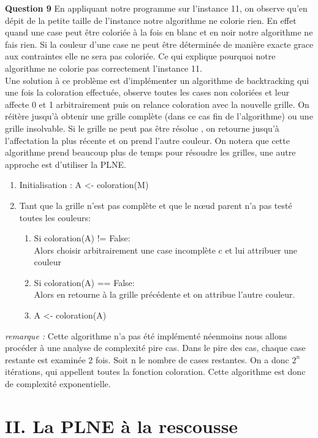 \documentclass[a4paper]{memoir}
\begin{document}
\textbf{Question 9} En appliquant notre programme sur l'instance 11, on observe qu'en dépit de la petite taille de l'instance notre algorithme ne colorie rien. En effet quand une case peut être coloriée à la fois en blanc et en noir notre algorithme ne fais rien. Si la couleur d'une case ne peut être déterminée de manière exacte grace aux contraintes elle ne sera pas coloriée. Ce qui explique pourquoi notre algorithme ne colorie pas correctement l'instance 11.
\\
Une solution à ce problème est d'implémenter un algorithme de backtracking qui une fois la coloration effectuée, observe toutes les cases non coloriées et leur affecte 0 et 1 arbitrairement puis on relance coloration avec la nouvelle grille. On réitère jusqu'à obtenir une grille complète (dans ce cas fin de l'algorithme) ou une grille insolvable. Si le grille ne peut pas être résolue , on retourne jusqu'à l'affectation la plus récente et on prend l'autre couleur. On notera que cette algorithme prend beaucoup plus de temps pour résoudre les grilles, une autre approche est d'utiliser la PLNE.\\
\begin{enumerate}
\item Initialisation : A <- coloration(M) 
\item Tant que la grille n'est pas complète et que le nœud parent n'a pas testé toutes les couleurs:
  \begin{enumerate}
    \item Si coloration(A) != False:\\
      Alors choisir arbitrairement une case incomplète c et lui attribuer une couleur
    \item Si coloration(A) == False:\\
      Alors en retourne à la grille précédente et on attribue l'autre couleur.
    \item  A <- coloration(A)
  \end{enumerate}
\end{enumerate}
\textit{remarque : } Cette algorithme n'a pas été implémenté néenmoins nous allons procéder à une analyse de complexité pire cas. Dans le pire des cas, chaque case restante est examinée 2 fois. Soit n le nombre de cases restantes. On a donc $2^n $ itérations, qui appellent toutes la fonction coloration. Cette algorithme est donc de complexité exponentielle.



 	
 	\newpage
 	\section{II. La PLNE à la rescousse}
\end{document}
